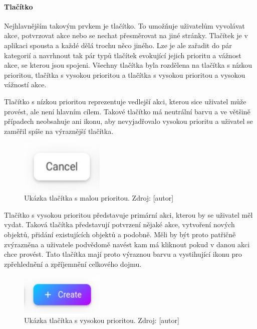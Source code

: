 			\paragraph{Tlačítko}

			Nejhlavnějším takovým prvkem je tlačítko.
			To umožňuje uživatelům vyvolávat akce, potvrzovat akce nebo se nechat přesměrovat na jiné stránky.
			Tlačítek je v aplikaci spousta a každé dělá trochu něco jiného.
			Lze je ale zařadit do pár kategorií a navrhnout tak pár typů tlačítek evokující jejich prioritu a vážnost akce,
			se kterou jsou spojeni.
			Všechny tlačítka byla rozdělena na tlačítka s nízkou prioritou, tlačítka s vysokou prioritou a tlačítka s vysokou
			prioritou a vysokou vážností akce.

			Tlačítko s nízkou prioritou reprezentuje vedlejší akci, kterou sice uživatel může provést, ale není hlavním cílem.
			Takové tlačítko má neutrální barvu a ve většině případech neobsahuje ani ikonu, aby nevyjadřovalo vysokou prioritu
			a uživatel se zaměřil spíše na výraznější tlačítka.

			\begin{figure}[H]
				\centering
				\includegraphics[width=4cm]{obrazky/tlacitko_s_malou_prioritou}\hfill
				\caption{Ukázka tlačítka s malou prioritou. Zdroj: [autor]}
			\end{figure}

			Tlačítko s vysokou prioritou představuje primární akci, kterou by se uživatel měl vydat.
			Taková tlačítka představují potvrzení nějaké akce, vytvoření nových objektů, přidání existujících objektů a
			podobně.
			Měli by být proto patřičně zvýrazněna a uživatele podvědomě navést kam má kliknout pokud v danou akci chce
			provést.
			Tato tlačítka mají proto výraznou barvu a vystihující ikonu pro zpřehlednění a zpříjemnění celkového dojmu.

			\begin{figure}[H]
				\centering
				\includegraphics[width=4cm]{obrazky/tlacitko_s_velkou_prioritou}\hfill
				\caption{Ukázka tlačítka s vysokou prioritou. Zdroj: [autor]}
			\end{figure}

